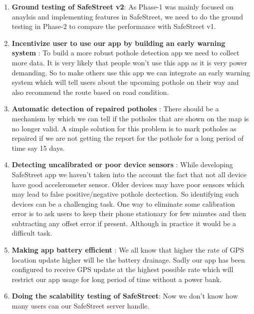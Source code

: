 \documentclass[12pt]{report}
\begin{document}
\begin{enumerate}

\item \textbf{Ground testing of SafeStreet v2}: As Phase-1 was mainly focused on
  anaylsis and implementing features in SafeStreet, we need to do the ground
  testing in Phase-2 to compare the performance with SafeStreet v1.

\item \textbf{Incentivize user to use our app by building an early warning
    system} : To build a more robust pothole detection app we need to collect
  more data. It is very likely that people won't use this app as it is very
  power demanding. So to make others use this app we can integrate an early
  warning system which will tell users about the upcoming pothole on their way
  and also recommend the route based on road condition.

\item \textbf{Automatic detection of repaired potholes} : There should be a
  mechanism by which we can tell if the potholes that are shown on the map is no
  longer valid. A simple solution for this problem is to mark potholes as
  repaired if we are not getting the report for the pothole for a long period of
  time say 15 days.


\item \textbf{Detecting uncalibrated or poor device sensors} : While developing
  SafeStreet app we haven't taken into the account the fact that not all device
  have good accelerometer sensor. Older devices may have poor sensors which may
  lead to false positive/negative pothole dectection. So identifying such
  devices can be a challenging task. One way to eliminate some calibration error
  is to ask users to keep their phone stationary for few minutes and then
  subtracting any offset error if present. Although in practice it would be a
  difficult task.

\item \textbf{Making app battery efficient} : We all know that higher the rate
  of GPS location update higher will be the battery drainage. Sadly our app has
  been configured to receive GPS update at the highest possible rate which will
  restrict our app usage for long period of time without a power bank.
 
\item \textbf{Doing the scalability testing of SafeStreet}: Now we don't know
  how many users can our SafeStreet server handle.

\end{enumerate}
\end{document}
